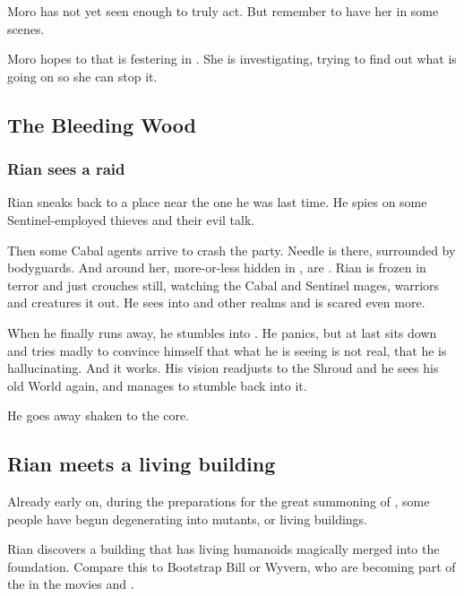 Moro has not yet seen enough to truly act. But remember to have her in some scenes. 

Moro hopes to  that is festering in \Malcur. 
She is investigating, trying to find out what is going on so she can stop it. 








\subsection{The Bleeding Wood}





\subsubsection{Rian sees a raid}
Rian sneaks back to a place near the one he was last time. 
He spies on some Sentinel-employed thieves and their evil talk. 

Then some Cabal agents arrive to crash the party. 
Needle is there, surrounded by bodyguards. 
And around her, more-or-less hidden in \Nyx, are \banerats{}. 
Rian is frozen in terror and just crouches still, watching the Cabal and Sentinel mages, warriors and creatures \rayuth it out. 
He sees into \Nyx{} and other realms and is scared even more. 


When he finally runs away, he stumbles into \Nyx. 
He panics, but at last sits down and tries madly to convince himself that what he is seeing is not real, that he is hallucinating. 
And it works. 
His vision readjusts to the Shroud and he sees his old World again, and manages to stumble back into it. 

He goes away shaken to the core. 





\subsection{Rian meets a living building}
Already early on, during the preparations for the great summoning of \Nithd{}, some people have begun degenerating into mutants, or living buildings. 

Rian discovers a building that has living humanoids magically merged into the foundation. Compare this to Bootstrap Bill or Wyvern, who are becoming part of the  in the movies \cite{Movie:PiratesoftheCaribbean:II} and \cite{Movie:PiratesoftheCaribbean:III}. 












